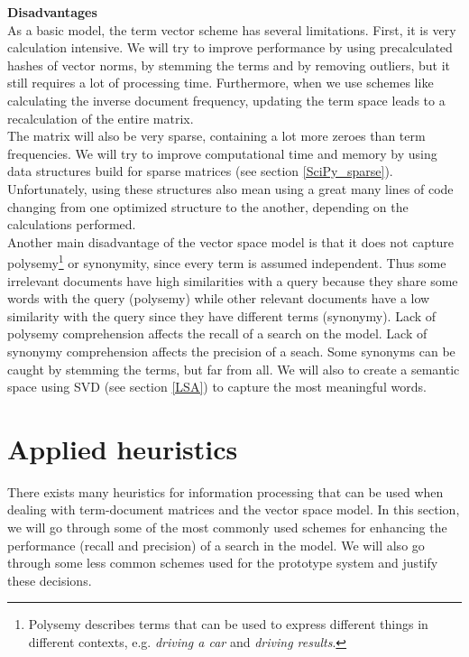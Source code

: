 \textbf{Disadvantages} \\
As a basic model, the term vector scheme has several
limitations. First, it is very calculation intensive. We will try to
improve performance by using precalculated hashes of vector norms, by
stemming the terms and by removing outliers, but it still requires a
lot of processing time. Furthermore, when we use schemes like
calculating the inverse document frequency, updating the term space
leads to a recalculation of the entire matrix.\\

The matrix will also be very sparse, containing a lot more zeroes than
term frequencies. We will try to improve computational time and memory
by using data structures build for sparse matrices (see section
\ref{SciPy_sparse}). Unfortunately, using these structures also mean
using a great many lines of code changing from one optimized structure
to the another, depending on the calculations performed.\\

Another main disadvantage of the vector space model is that it does
not capture polysemy\footnote{Polysemy describes terms that can be
  used to express different things in different contexts,
  e.g. \textit{driving a car} and \textit{driving results}. } or
synonymity, since every term is assumed independent. Thus some
irrelevant documents have high similarities with a query because they
share some words with the query (polysemy) while other relevant
documents have a low similarity with the query since they have
different terms (synonymy).  Lack of polysemy comprehension affects
the recall of a search on the model. Lack of synonymy comprehension
affects the precision of a seach. Some synonyms can be caught by
stemming the terms, but far from all. We will also to create a
semantic space using SVD (see section \ref{LSA}) to capture the most
meaningful words.

\section{Applied heuristics}

There exists many heuristics for information processing that can be
used when dealing with term-document matrices and the vector space
model. In this section, we will go through some of the most commonly
used schemes for enhancing the performance (recall and precision) of a
search in the model. We will also go through some less common schemes
used for the prototype system and justify these decisions.


